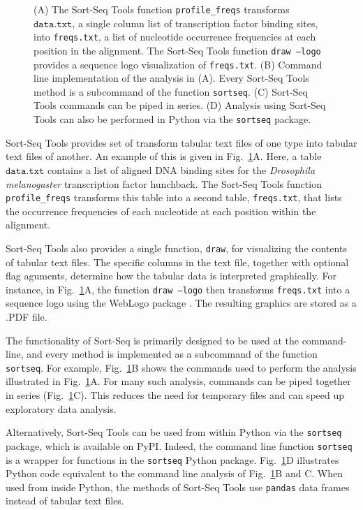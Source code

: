 \documentclass{bmcart}
\newcommand{\fig}[2]{Fig.\ \ref{#1}#2}
\begin{document}
%
%
\begin{figure}[h!]
\caption{
(A) The Sort-Seq Tools function \texttt{profile\_freqs} transforms $\texttt{data.txt}$, a single column list of transcription factor binding sites, into \texttt{freqs.txt}, a list of nucleotide occurrence frequencies at each position in the alignment. The Sort-Seq Tools function \texttt{draw --logo} provides a sequence logo visualization of \texttt{freqs.txt}. (B) Command line implementation of the analysis in (A). Every Sort-Seq Tools method is a subcommand of the function \texttt{sortseq}. (C) Sort-Seq Tools commands can be piped in series. (D) Analysis using Sort-Seq Tools can also be performed in Python via the \texttt{sortseq} package.
}
\label{fig:demo}
\end{figure}

Sort-Seq Tools provides set of transform tabular text files of one type into tabular text files of another. An example of this is given in \fig{fig:demo}{A}. Here, a table $\texttt{data.txt}$ contains a list of aligned DNA binding sites for the \textit{Drosophila melanogaster} transcription factor hunchback. The Sort-Seq Tools function \texttt{profile\_freqs} transforms this table into a second table, \texttt{freqs.txt}, that lists the occurrence frequencies of each nucleotide at each position within the alignment. 

Sort-Seq Tools also provides a single function, \texttt{draw}, for visualizing the contents of tabular text files. The specific columns in the text file, together with optional flag aguments, determine how the tabular data is interpreted graphically. 
For instance, in \fig{fig:demo}{A}, the function \texttt{draw --logo} then transforms \texttt{freqs.txt} into a sequence logo \cite{Schneider:1990ub} using the WebLogo package \cite{Crooks:2004do}. The resulting graphics are stored as a .PDF file. 

The functionality of Sort-Seq is primarily designed to be used at the command-line, and every method is implemented as a subcommand of the function \texttt{sortseq}. For example, \fig{fig:demo}{B} shows the commands used to perform the analysis illustrated in \fig{fig:demo}{A}. For many such analysis, commands can be piped together in series (\fig{fig:demo}{C}). This reduces the need for temporary files and can speed up exploratory data analysis. 

Alternatively, Sort-Seq Tools can be used from within Python  via the \texttt{sortseq} package, which is available on PyPI. Indeed, the command line function \texttt{sortseq} is a wrapper for functions in the \texttt{sortseq} Python package. \fig{fig:demo}{D} illustrates Python code equivalent to the command line analysis of \fig{fig:demo}{B and C}. When used from inside Python, the methods of Sort-Seq Tools use \texttt{pandas} data frames instead of tabular text files. 
\end{document}
